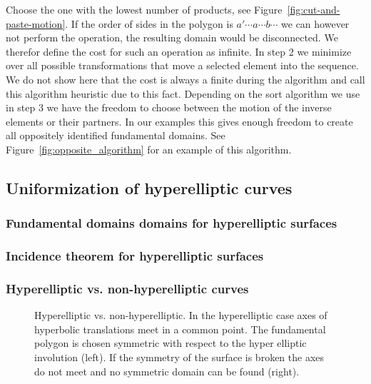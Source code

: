 \documentclass[Thesis.tex]{subfiles}
\begin{document}
Choose the one with the lowest number of products, see Figure~\ref{fig:cut-and-paste-motion}. If the order of sides in the polygon is $a' \cdots a \cdots b \cdots$ we can however not perform the operation, the resulting domain would be disconnected. We therefor define the cost for such an operation as infinite. In step 2 we minimize over all possible transformations that move a selected element into the sequence. We do not show here that the cost is always a finite during the algorithm and call this algorithm heuristic due to this fact. Depending on the sort algorithm we use in step 3 we have the freedom to choose between the motion of the inverse elements or their partners. In our examples this gives enough freedom to create all oppositely identified fundamental domains. See Figure~\ref{fig:opposite_algorithm} for an example of this algorithm.



\subsection{Uniformization of hyperelliptic curves}
\label{sec:hyperelliptic}

\subsubsection{Fundamental domains domains for hyperelliptic surfaces}
\label{sec:hyperelliptic_domain}


\subsubsection{Incidence theorem for hyperelliptic surfaces}

\subsubsection{Hyperelliptic vs. non-hyperelliptic curves}
\label{sec:non-hyperelliptic}

\begin{figure}
\centering
{}
\caption{Hyperelliptic vs. non-hyperelliptic. In the hyperelliptic case axes of hyperbolic translations meet in a common point. The fundamental polygon is chosen symmetric with respect to the hyper elliptic involution (left). If the symmetry of the surface is broken the axes do not meet and no symmetric domain can be found (right).}
\label{fig:non-hyperelliptic}
\end{figure}
\end{document}
